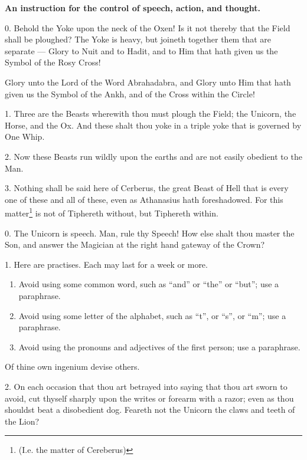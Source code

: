 
\textbf{An instruction for the control of speech, action, and thought.}


0. Behold the Yoke upon the neck of the Oxen! Is it not thereby that the Field shall be ploughed? The Yoke is heavy, but joineth together them that are separate --- Glory to Nuit and to Hadit, and to Him that hath given us the Symbol of the Rosy Cross!

Glory unto the Lord of the Word Abrahadabra, and Glory unto Him that hath given us the Symbol of the Ankh, and of the Cross within the Circle!

1. Three are the Beasts wherewith thou must plough the Field; the Unicorn, the Horse, and the Ox. And these shalt thou yoke in a triple yoke that is governed by One Whip.

2. Now these Beasts run wildly upon the earths and are not easily obedient to the Man.

3. Nothing shall be said here of Cerberus, the great Beast of Hell that is every one of these and all of these, even as Athanasius hath foreshadowed. For this matter\footnote{(I.e. the matter of Cereberus)} is not of Tiphereth without, but Tiphereth within. 

0. The Unicorn is speech. Man, rule thy Speech! How else shalt thou master the Son, and answer the Magician at the right hand gateway of the Crown?

1. Here are practises. Each may last for a week or more.
\begin{enumerate}[label=\greek*.]
\item Avoid using some common word, such as \enquote{and} or \enquote{the} or \enquote{but}; use a paraphrase.

\item Avoid using some letter of the alphabet, such as \enquote{t}, or \enquote{s}, or \enquote{m}; use a paraphrase.

\item Avoid using the pronouns and adjectives of the first person; use a paraphrase.
\end{enumerate}
Of thine own ingenium devise others.

2. On each occasion that thou art betrayed into saying that thou art sworn to avoid, cut thyself sharply upon the writes or forearm with a razor; even as thou shouldst beat a disobedient dog. Feareth not the Unicorn the claws and teeth of the Lion?

